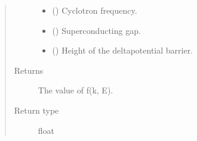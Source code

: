\documentclass[letterpaper,10pt,english]{sphinxmanual}
\begin{document}
\begin{fulllineitems}
\begin{quote}
\begin{description}
\begin{itemize}
\item {} 
\sphinxAtStartPar
{} () \textendash{} Cyclotron frequency.

\item {} 
\sphinxAtStartPar
{} () \textendash{} Superconducting gap.

\item {} 
\sphinxAtStartPar
{} () \textendash{} Height of the delta\sphinxhyphen{}potential barrier.

\end{itemize}

\item[{Returns}] \leavevmode
\sphinxAtStartPar
The value of f(k, E).

\item[{Return type}] \leavevmode
\sphinxAtStartPar
float

\end{description}\end{quote}

\end{fulllineitems}

\end{document}
